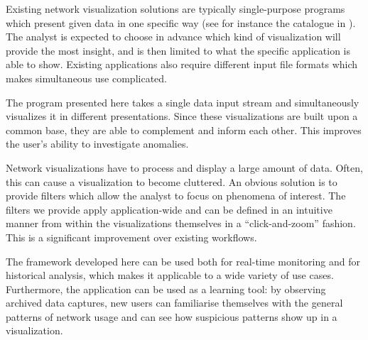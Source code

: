 Existing network visualization solutions are typically single-purpose programs which present given data in one specific way (see for instance the catalogue in \cite{marty2009applied}). The analyst is expected to choose in advance which kind of visualization will provide the most insight, and is then limited to what the specific application is able to show. Existing applications also require different input file formats which makes simultaneous use complicated.

The program presented here takes a single data input stream and simultaneously visualizes it in different presentations. Since these visualizations are built upon a common base, they are able to complement and inform each other. This improves the user's ability to investigate anomalies.

Network visualizations have to process and display a large amount of data. Often, this can cause a visualization to become cluttered. An obvious solution is to provide filters which allow the analyst to focus on phenomena of interest. The filters we provide apply application-wide and can be defined in an intuitive manner from within the visualizations themselves in a ``click-and-zoom'' fashion. This is a significant improvement over existing workflows.

The framework developed here can be used both for real-time monitoring and for historical analysis, which makes it applicable to a wide variety of use cases. Furthermore, the application can be used as a learning tool: by observing archived data captures, new users can familiarise themselves with the general patterns of network usage and can see how suspicious patterns show up in a visualization.